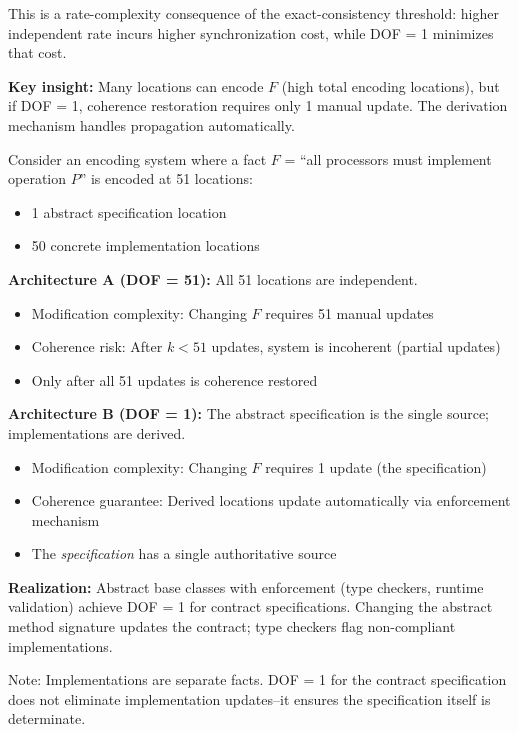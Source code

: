 This is a rate-complexity consequence of the exact-consistency threshold: higher independent rate incurs higher synchronization cost, while DOF = 1 minimizes that cost.

\textbf{Key insight:} Many locations can encode $F$ (high total encoding locations), but if DOF = 1, coherence restoration requires only 1 manual update. The derivation mechanism handles propagation automatically.

\begin{example}\label{ex:ssot-large-m}
Consider an encoding system where a fact $F$ = ``all processors must implement operation $P$'' is encoded at 51 locations:
\begin{itemize}
\tightlist
\item 1 abstract specification location
\item 50 concrete implementation locations
\end{itemize}

\textbf{Architecture A (DOF = 51):} All 51 locations are independent.
\begin{itemize}
\tightlist
\item Modification complexity: Changing $F$ requires 51 manual updates
\item Coherence risk: After $k < 51$ updates, system is incoherent (partial updates)
\item Only after all 51 updates is coherence restored
\end{itemize}

\textbf{Architecture B (DOF = 1):} The abstract specification is the single source; implementations are derived.
\begin{itemize}
\tightlist
\item Modification complexity: Changing $F$ requires 1 update (the specification)
\item Coherence guarantee: Derived locations update automatically via enforcement mechanism
\item The \emph{specification} has a single authoritative source
\end{itemize}

\textbf{Realization:} Abstract base classes with enforcement (type checkers, runtime validation) achieve DOF = 1 for contract specifications. Changing the abstract method signature updates the contract; type checkers flag non-compliant implementations.

Note: Implementations are separate facts. DOF = 1 for the contract specification does not eliminate implementation updates--it ensures the specification itself is determinate.
\end{example}

